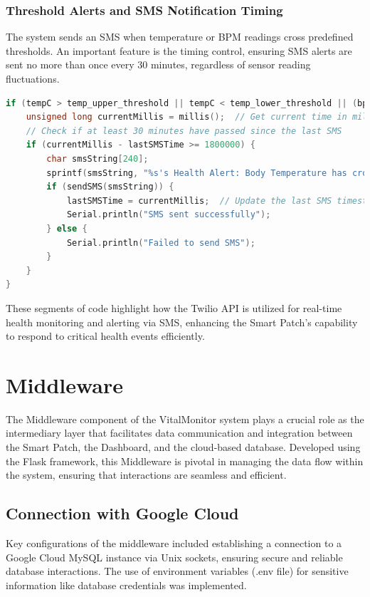 \subsubsection{Threshold Alerts and SMS Notification Timing}

The system sends an SMS when temperature or BPM readings cross predefined thresholds. An important feature is the timing control, ensuring SMS alerts are sent no more than once every 30 minutes, regardless of sensor reading fluctuations.

\begin{lstlisting}[language=C++, caption={Conditional SMS Notifications Based on Thresholds}]
if (tempC > temp_upper_threshold || tempC < temp_lower_threshold || (bpm > bpm_upper_threshold && bpm > 0) || (bpm < bpm_lower_threshold && bpm > 0)) {
    unsigned long currentMillis = millis();  // Get current time in milliseconds
    // Check if at least 30 minutes have passed since the last SMS
    if (currentMillis - lastSMSTime >= 1800000) {
        char smsString[240]; 
        sprintf(smsString, "%s's Health Alert: Body Temperature has crossed %.2f°C and current BPM is %d.", name, tempC, bpm);
        if (sendSMS(smsString)) {
            lastSMSTime = currentMillis;  // Update the last SMS timestamp
            Serial.println("SMS sent successfully");
        } else {
            Serial.println("Failed to send SMS");
        }
    }
}
\end{lstlisting}

These segments of code highlight how the Twilio API is utilized for real-time health monitoring and alerting via SMS, enhancing the Smart Patch's capability to respond to critical health events efficiently.









\section{Middleware}
The Middleware component of the VitalMonitor system plays a crucial role as the intermediary layer that facilitates data communication and integration between the Smart Patch, the Dashboard, and the cloud-based database. Developed using the Flask framework, this Middleware is pivotal in managing the data flow within the system, ensuring that interactions are seamless and efficient.

\subsection{Connection with Google Cloud}
Key configurations of the middleware included establishing a connection to a Google Cloud MySQL instance via Unix sockets, ensuring secure and reliable database interactions. The use of environment variables (.env file) for sensitive information like database credentials was implemented.

